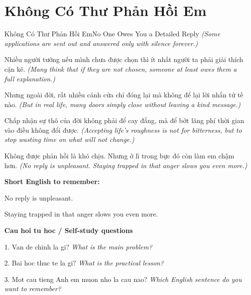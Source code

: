 \section{Không Có Thư Phản Hồi Em}
\begin{truyen}{Không Có Thư Phản Hồi Em}{No One Owes You a Detailed Reply}
\textit{(Some applications are sent out and answered only with silence forever.)}

Nhiều người tưởng nếu mình chưa được chọn thì ít nhất người ta phải giải thích cặn kẽ.
\textit{(Many think that if they are not chosen, someone at least owes them a full explanation.)}

Nhưng ngoài đời, rất nhiều cánh cửa chỉ đóng lại mà không để lại lời nhắn tử tế nào.
\textit{(But in real life, many doors simply close without leaving a kind message.)}

Chấp nhận sự thô của đời không phải để cay đắng, mà để bớt lãng phí thời gian vào điều không đổi được.
\textit{(Accepting life’s roughness is not for bitterness, but to stop wasting time on what will not change.)}

\end{truyen}

\begin{baihoc}
Không được phản hồi là khó chịu. Nhưng ở lì trong bực đó còn làm em chậm hơn.
\textit{(No reply is unpleasant. Staying trapped in that anger slows you even more.)}
\end{baihoc}

\begin{ghinhoanh}
\textbf{Short English to remember:}

No reply is unpleasant.

Staying trapped in that anger slows you even more.

\end{ghinhoanh}

\begin{tuhocnhanh}
\textbf{Cau hoi tu hoc / Self-study questions}

1. Van de chinh la gi? \textit{What is the main problem?}

2. Bai hoc thuc te la gi? \textit{What is the practical lesson?}

3. Mot cau tieng Anh em muon nho la cau nao? \textit{Which English sentence do you want to remember?}
\end{tuhocnhanh}
\ngancach

